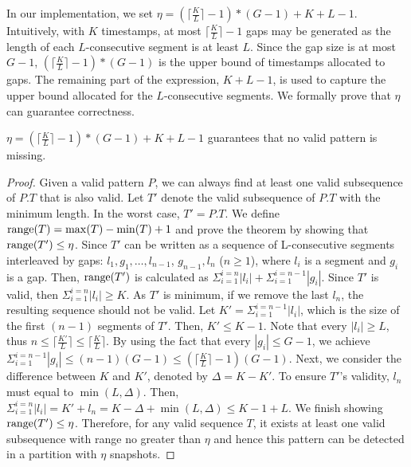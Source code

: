 In our implementation, we set $\eta = (\lceil \frac{K}{L} \rceil - 1)*(G-1)+K+L-1$. Intuitively, with $K$ timestamps, at most $\lceil \frac{K}{L} \rceil - 1$ gaps may be generated as the length of each $L$-consecutive segment is at least $L$. Since the gap size is at most $G-1$, $(\lceil \frac{K}{L} \rceil - 1)*(G-1)$ is the upper bound of timestamps allocated to gaps. The remaining part of the expression, $K+L-1$, is used to capture the upper bound allocated for the $L$-consecutive segments. We formally prove that $\eta$ can guarantee correctness.


\begin{theorem}
\label{THM:RP_ETA}
$\eta = (\lceil \frac{K}{L} \rceil - 1)*(G-1)+K+L-1$ guarantees that no valid pattern is missing.
\end{theorem}
\begin{proof}
Given a valid pattern $P$, we can always find at least one valid subsequence of $P.T$ that is also valid. Let $T'$ denote the valid subsequence of $P.T$ with the minimum length. In the worst case, $T'=P.T$. We define $\operatorname*{range}(T)=\max(T) - \min(T) +1$ and prove the theorem by showing that $\operatorname*{range}(T') \leq \eta$.
Since $T'$ can be written as a sequence of L-consecutive segments interleaved by gaps: $l_1,g_1,\ldots,l_{n-1}$, $g_{n-1},l_n$ ($n \geq 1$),
where $l_i$ is a segment and $g_i$ is a gap. Then, $\operatorname*{range}(T')$
is calculated as $\Sigma_{i=1}^{i=n}|l_i| + \Sigma_{i=1}^{i=n-1} |g_i|$. Since $T'$
is valid, then $\Sigma_{i=1}^{i=n}|l_i| \geq K$. As $T'$ is minimum, if we remove the 
last $l_n$, the resulting sequence should not be valid. Let $K' = \Sigma_{i=1}^{i=n-1}|l_i|$, which
is the size of the first $(n-1)$ segments of $T'$. Then, $K' \leq K-1$.
Note that every $|l_i| \geq L$, thus $n \leq \lceil \frac{K'}{L} \rceil \leq \lceil \frac{K}{L} \rceil $. By
using the fact that every $|g_i| \leq G-1$, we achieve $\Sigma_{i=1}^{i=n-1} |g_i| \leq (n-1)(G-1)
\leq (\lceil \frac{K}{L} \rceil -1)(G-1)$. Next, we consider the difference between $K$ and $K'$, denoted by
$\Delta = K- K'$. To ensure $T'$'s validity, $l_n$ must equal to $\min(L, \Delta)$.
Then, $\Sigma_{i=1}^{i=n}|l_i| = K' + l_n = K - \Delta + \min(L, \Delta) \leq K - 1 + L$. We finish showing $\operatorname*{range}(T') \leq \eta$.  Therefore, for any valid sequence $T$, it exists at least one valid subsequence with range no greater than $\eta$ and hence this pattern can be detected in a partition with $\eta$ snapshots.
\end{proof}


